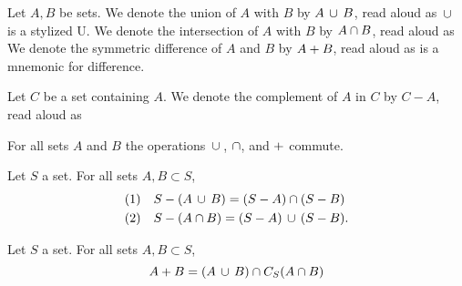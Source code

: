 Let $A, B$ be sets.
We denote the union of $A$ with $B$ by $A \,\cup\, B$, read aloud as 
$\,\cup\,$ is a stylized U.
We denote the intersection of $A$ with $B$ by $A \cap B$, read aloud as 
We denote the symmetric difference of $A$ and $B$ by $A + B$, read aloud as 
 is a mnemonic for difference.

Let $C$ be a set containing $A$.
We denote the complement of $A$ in $C$ by $C - A$, read aloud as 


\begin{prop}
  For all sets $A$ and $B$ the operations $\,\cup\,$, $\cap$, and $+$ commute.
\end{prop}

\begin{prop}
  Let $S$ a set.
  For all sets $A, B \subset S$,
  \[
    \begin{aligned}
      \text{(1)} \quad & S - (A \,\cup\, B) = (S - A) \cap (S - B) \\
      \text{(2)} \quad & S - (A \cap B) = (S - A) \,\cup\, (S - B).
    \end{aligned}
  \]
\end{prop}

\begin{prop}
  Let $S$ a set. For all sets $A, B \subset S$,
  \[
    A + B = (A \,\cup\, B) \cap C_S(A \cap B)
  \]
\end{prop}
\strats

